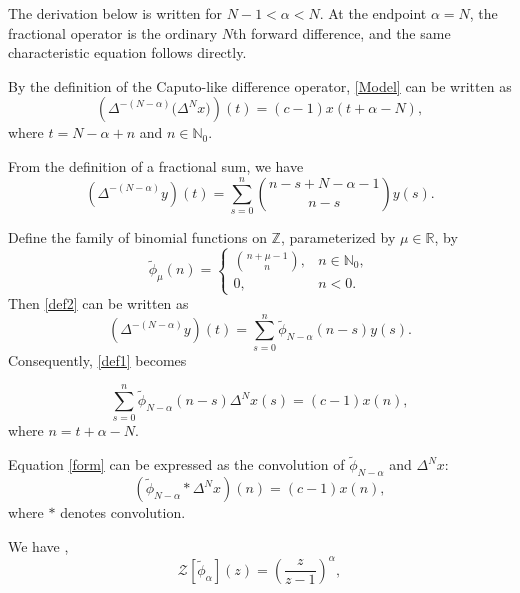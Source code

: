 \documentclass[11pt,a4paper]{article}
\theoremstyle{definition}
\begin{document}
The derivation below is written for $N-1<\alpha<N$. At the endpoint $\alpha=N$, the fractional operator is the ordinary $N$th forward difference, and the same characteristic equation follows directly.

By the definition of the Caputo-like difference operator, \eqref{Model} can be written as
\begin{equation}
	\left(\Delta^{-(N-\alpha)}\bigl(\Delta^N x\bigr)\right)(t)
	= (c - 1)x(t + \alpha - N), \label{def1}
\end{equation}
where $t = N - \alpha + n$ and $n \in \mathbb{N}_0$.

From the definition of a fractional sum, we have
\begin{equation}
	\left(\Delta^{-(N-\alpha)}y\right)(t)
	= \sum_{s=0}^{n} \binom{n - s + N - \alpha - 1}{n - s}y(s). \label{def2}
\end{equation}

Define the family of binomial functions on $\mathbb{Z}$, parameterized by $\mu \in \mathbb{R}$, by
\begin{equation}
\tilde{\phi}_{\mu}(n) =
\begin{cases}
	\displaystyle \binom{n + \mu - 1}{n}, & n \in \mathbb{N}_0, \\
	0, & n < 0.
\end{cases}
\end{equation}
Then \eqref{def2} can be written as
\begin{equation}
	\left(\Delta^{-(N-\alpha)}y\right)(t)
	= \sum_{s=0}^{n} \tilde{\phi}_{N-\alpha}(n - s)y(s). \label{def3}
\end{equation}
Consequently, \eqref{def1} becomes

\begin{equation}
	\sum_{s=0}^{n} \tilde{\phi}_{N-\alpha}(n - s)\Delta^N x(s) = (c - 1)x(n), \label{form}
\end{equation}
where $n = t + \alpha - N$.

Equation \eqref{form} can be expressed as the convolution of $\tilde{\phi}_{N-\alpha}$ and $\Delta^N x$:
\begin{equation}
	(\tilde{\phi}_{N-\alpha} \ast \Delta^N x)(n) = (c - 1)x(n), \label{convolution}
\end{equation}
where $\ast$ denotes convolution.

We have \cite{mozyrska2015z},
\begin{equation}
	\mathcal{Z}[\tilde{\phi}_{\alpha}](z) = \left(\frac{z}{z - 1}\right)^{\alpha}, \label{formula1}
\end{equation}
\end{document}
